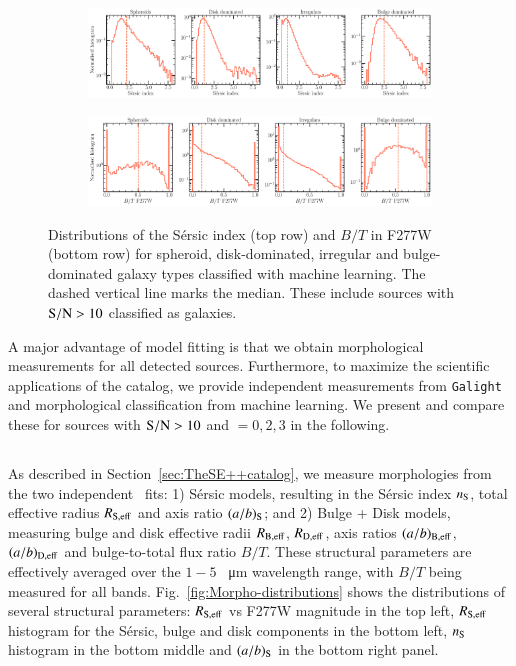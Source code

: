 \documentclass[longauth]{aa}
\begin{document}
\begin{figure}[t!]
  \centering
\begin{subfigure}[b]{0.9\textwidth}
            \includegraphics[width=1\hsize]{figures/Morphology_distributions-vs-ML_sersic.pdf}     
  \end{subfigure}
  \begin{subfigure}[b]{0.9\textwidth}
            \includegraphics[width=1\hsize]{figures/Morphology_distributions-vs-ML_BD.pdf}     
  \end{subfigure}
 \caption{Distributions of the S\'ersic index (top row) and $B/T$ in F277W (bottom row) for spheroid, disk-dominated, irregular and bulge-dominated galaxy types classified with machine learning. The dashed vertical line marks the median. These include sources with ${\rm S/N}>10$ classified as galaxies.}
  \label{fig:Morpho-compar-ML}
\end{figure}

A major advantage of model fitting is that we obtain morphological measurements for all detected sources. Furthermore, to maximize the scientific applications of the catalog, we provide independent measurements from \texttt{Galight} and morphological classification from machine learning. We present and compare these for sources with ${\rm S/N}>10$ and \warnfl$={0,2,3}$ in the following.

\subsection{\SEpp}
As described in Section~\ref{sec:TheSE++catalog}, we measure morphologies from the two independent \SEpp\ fits: 1) S\'ersic models, resulting in the S\'ersic index $n_{\rm S}$, total effective radius $R_{\rm S,eff}$ and axis ratio $(a/b)_{\rm S}$; and 2) Bulge + Disk models, measuring bulge and disk effective radii $R_{\rm B,eff}$, $R_{\rm D,eff}$, axis ratios $(a/b)_{\rm B,eff}$, $(a/b)_{\rm D,eff}$ and bulge-to-total flux ratio $B/T$. These structural parameters are effectively averaged over the $1-5$ \SI{}{\micro \meter} wavelength range, with $B/T$ being measured for all bands. Fig.~\ref{fig:Morpho-distributions} shows the distributions of several structural parameters: $R_{\rm S,eff}$ vs F277W magnitude in the top left, $R_{\rm S,eff}$ histogram for the S\'ersic, bulge and disk components in the bottom left, $n_{\rm S}$ histogram in the bottom middle and $(a/b)_{\rm S}$ in the bottom right panel. 
\end{document}
